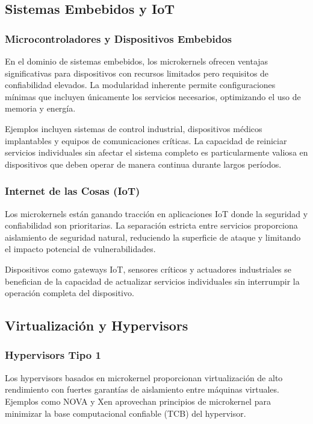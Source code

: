 \documentclass[12pt,a4paper]{article}
\begin{document}
\subsection{Sistemas Embebidos y IoT}

\subsubsection{Microcontroladores y Dispositivos Embebidos}

En el dominio de sistemas embebidos, los microkernels ofrecen ventajas significativas para dispositivos con recursos limitados pero requisitos de confiabilidad elevados. La modularidad inherente permite configuraciones mínimas que incluyen únicamente los servicios necesarios, optimizando el uso de memoria y energía.

Ejemplos incluyen sistemas de control industrial, dispositivos médicos implantables y equipos de comunicaciones críticas. La capacidad de reiniciar servicios individuales sin afectar el sistema completo es particularmente valiosa en dispositivos que deben operar de manera continua durante largos períodos.

\subsubsection{Internet de las Cosas (IoT)}

Los microkernels están ganando tracción en aplicaciones IoT donde la seguridad y confiabilidad son prioritarias. La separación estricta entre servicios proporciona aislamiento de seguridad natural, reduciendo la superficie de ataque y limitando el impacto potencial de vulnerabilidades.

Dispositivos como gateways IoT, sensores críticos y actuadores industriales se benefician de la capacidad de actualizar servicios individuales sin interrumpir la operación completa del dispositivo.

\subsection{Virtualización y Hypervisors}

\subsubsection{Hypervisors Tipo 1}

Los hypervisors basados en microkernel proporcionan virtualización de alto rendimiento con fuertes garantías de aislamiento entre máquinas virtuales. Ejemplos como NOVA y Xen aprovechan principios de microkernel para minimizar la base computacional confiable (TCB) del hypervisor.
\end{document}
